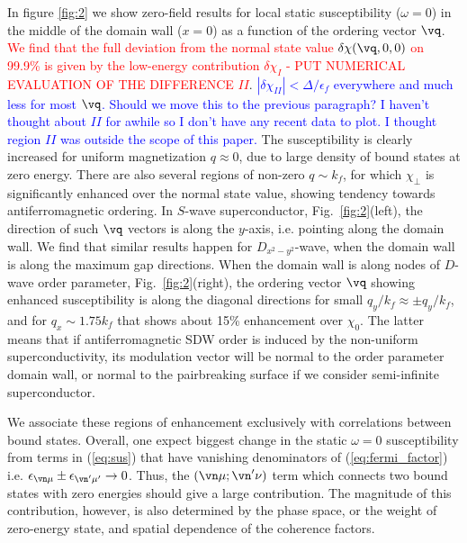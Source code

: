\documentclass[prb,aps,showpacs,amsmath,twocolumn,10pt]{revtex4-1}
\newcommand{\blue}{\textcolor{blue}}
\newcommand{\red}{\textcolor{red}}
\begin{document}
In figure \ref{fig:2} we show zero-field results for local static susceptibility ($\omega=0$) in the middle of the domain wall ($x=0$) 
as a function of the ordering vector $\vq$. 
\red{We find that the full deviation from the normal state value $\delta\chi(\vq,0,0)$ on 
99.9\% is given by the low-energy contribution $\delta\chi_I$ - PUT NUMERICAL EVALUATION OF THE DIFFERENCE $II$}. \blue{$|\delta\chi_{II}|<\Delta/\epsilon_f$ everywhere and much less for most $\vq$. Should we move this to the previous paragraph? I haven't thought about $II$ for awhile so I don't have any recent data to plot. I thought region $II$ was outside the scope of this paper.}
The susceptibility is clearly increased for uniform magnetization $q\approx0$, due to large density of bound states at 
zero energy. There are also several regions of non-zero $q \sim k_f$, for which $\chi_\perp$ is significantly enhanced over the normal
state value, showing tendency towards antiferromagnetic ordering. 
In $S$-wave superconductor, Fig.~\ref{fig:2}(left), the direction of such $\vq$ vectors is along the $y$-axis, i.e. pointing along the domain
wall. We find that similar results happen for $D_{x^2-y^2}$-wave, when the domain wall is along the maximum gap
directions. 
%
When the domain wall is along nodes of $D$-wave order parameter, Fig.~\ref{fig:2}(right), the ordering vector $\vq$ showing enhanced 
susceptibility is along the diagonal directions for small $q_y/k_f \approx \pm q_y/k_f$, 
and for $q_x \sim 1.75 k_f$ that shows about 15\% enhancement over $\chi_0$. 
The latter means that if antiferromagnetic SDW order is induced by the non-uniform superconductivity, 
its modulation vector will be normal to the order parameter domain wall, or normal to the 
pairbreaking surface if we consider semi-infinite superconductor. %

We associate these regions of enhancement exclusively with correlations between bound states. 
Overall, one expect biggest change in the static $\omega=0$ susceptibility from terms in 
(\ref{eq:sus}) that have vanishing denominators of (\ref{eq:fermi_factor}) i.e.  
$\epsilon_{\vn\mu}\pm\epsilon_{\vn'\mu'} \to 0 $. 
Thus, the $(\vn\mu;\vn'\nu)$ term
which connects two bound states with zero energies should give a large contribution. 
The magnitude of this contribution, however, is also determined by the phase space, 
or the weight of zero-energy state,
and spatial dependence of the coherence factors. 
\end{document}
